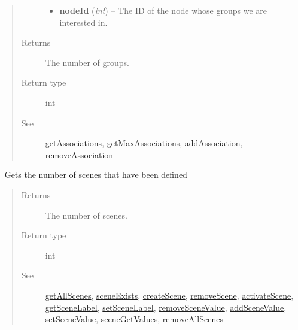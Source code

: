 \documentclass[letterpaper,10pt,english]{sphinxmanual}
\begin{document}
\begin{fulllineitems}
\begin{fulllineitems}
\begin{quote}
\begin{description}
\begin{itemize}
\item {} 
\textbf{nodeId} (\emph{int}) -- The ID of the node whose groups we are interested in.

\end{itemize}

\item[{Returns}] \leavevmode
The number of groups.

\item[{Return type}] \leavevmode
int

\item[{See}] \leavevmode
{\hyperref[libopenzwave:getassociations]{getAssociations}}, {\hyperref[libopenzwave:getmaxassociations]{getMaxAssociations}}, {\hyperref[libopenzwave:addassociation]{addAssociation}}, {\hyperref[libopenzwave:removeassociation]{removeAssociation}}

\end{description}\end{quote}

\end{fulllineitems}


\begin{fulllineitems}
\label{libopenzwave:libopenzwave.PyManager.getNumScenes}~\label{libopenzwave:getnumscenes}
Gets the number of scenes that have been defined
\begin{quote}\begin{description}
\item[{Returns}] \leavevmode
The number of scenes.

\item[{Return type}] \leavevmode
int

\item[{See}] \leavevmode
{\hyperref[libopenzwave:getallscenes]{getAllScenes}}, {\hyperref[libopenzwave:sceneexists]{sceneExists}}, {\hyperref[libopenzwave:createscene]{createScene}}, {\hyperref[libopenzwave:removescene]{removeScene}}, {\hyperref[libopenzwave:activatescene]{activateScene}}, {\hyperref[libopenzwave:getscenelabel]{getSceneLabel}}, {\hyperref[libopenzwave:setscenelabel]{setSceneLabel}}, {\hyperref[libopenzwave:removescenevalue]{removeSceneValue}}, {\hyperref[libopenzwave:addscenevalue]{addSceneValue}}, {\hyperref[libopenzwave:setscenevalue]{setSceneValue}}, {\hyperref[libopenzwave:scenegetvalues]{sceneGetValues}}, {\hyperref[libopenzwave:removeallscenes]{removeAllScenes}}


\end{description}
\end{quote}
\end{fulllineitems}
\end{fulllineitems}
\end{document}
